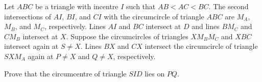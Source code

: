 Let $ABC$ be a triangle with incentre $I$ such that $AB < AC < BC$. The second intersections of $AI$, $BI$, and $CI$ with the circumcircle of triangle $ABC$ are $M_A$, $M_B$, and $M_C$, respectively. Lines $AI$ and $BC$ intersect at $D$ and lines $BM_C$ and $CM_B$ intersect at $X$. Suppose the circumcircles of triangles $XM_BM_C$ and $XBC$ intersect again at $S \neq X$. Lines $BX$ and $CX$ intersect the circumcircle of triangle $SXM_A$ again at $P \neq X$ and $Q \neq X$, respectively.

Prove that the circumcentre of triangle $SID$ lies on $PQ$.
